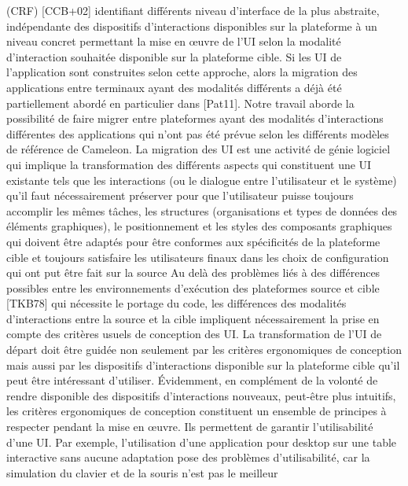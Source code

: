 \documentclass{article}
\begin{document}
(CRF) [CCB+02] identiﬁant diff\'{e}rents niveau d’interface de la plus abstraite, ind\'{e}pendante des dispositifs d’interactions disponibles sur la plateforme \`{a} un niveau concret permettant la mise en œuvre
de l’UI selon la modalit\'{e} d’interaction souhait\'{e}e disponible sur la plateforme cible. Si les UI de l’application sont construites selon cette approche, alors la migration des applications entre terminaux
ayant des modalit\'{e}s diff\'{e}rents a d\'{e}j\`{a} \'{e}t\'{e} partiellement abord\'{e} en particulier dans [Pat11]. Notre travail
aborde la possibilit\'{e} de faire migrer entre plateformes ayant des modalit\'{e}s d’interactions diff\'{e}rentes
des applications qui n’ont pas \'{e}t\'{e} pr\'{e}vue selon les diff\'{e}rents mod\`{e}les de r\'{e}f\'{e}rence de Cameleon.
La migration des UI est une activit\'{e} de g\'{e}nie logiciel qui implique la transformation des diff\'{e}rents
aspects qui constituent une UI existante tels que les interactions (ou le dialogue entre l’utilisateur
et le syst\`{e}me) qu’il faut n\'{e}cessairement pr\'{e}server pour que l’utilisateur puisse toujours accomplir
les m\^{e}mes t\^{a}ches, les structures (organisations et types de donn\'{e}es des \'{e}l\'{e}ments graphiques), le positionnement et les styles des composants graphiques qui doivent \^{e}tre adapt\'{e}s pour \^{e}tre conformes
aux sp\'{e}ciﬁcit\'{e}s de la plateforme cible et toujours satisfaire les utilisateurs ﬁnaux dans les choix de
conﬁguration qui ont put \^{e}tre fait sur la source
Au del\`{a} des probl\`{e}mes li\'{e}s \`{a} des diff\'{e}rences possibles entre les environnements d’ex\'{e}cution des
plateformes source et cible [TKB78] qui n\'{e}cessite le portage du code, les diff\'{e}rences des modalit\'{e}s
d’interactions entre la source et la cible impliquent n\'{e}cessairement la prise en compte des crit\`{e}res
usuels de conception des UI. La transformation de l’UI de d\'{e}part doit \^{e}tre guid\'{e}e non seulement par
les crit\`{e}res ergonomiques de conception mais aussi par les dispositifs d’interactions disponible sur la
plateforme cible qu’il peut \^{e}tre int\'{e}ressant d’utiliser.
Évidemment, en compl\'{e}ment de la volont\'{e} de rendre disponible des dispositifs d’interactions
nouveaux, peut-\^{e}tre plus intuitifs, les crit\`{e}res ergonomiques de conception constituent un ensemble de
principes \`{a} respecter pendant la mise en œuvre. Ils permettent de garantir l’utilisabilit\'{e} d’une UI. Par
exemple, l’utilisation d’une application pour desktop sur une table interactive sans aucune adaptation
pose des probl\`{e}mes d’utilisabilit\'{e}, car la simulation du clavier et de la souris n’est pas le meilleur
\end{document}
